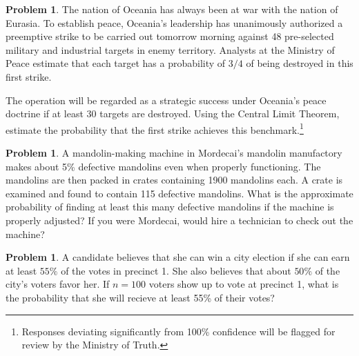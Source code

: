\documentclass[10pt]{article}
\theoremstyle{definition}
\newtheorem{problem}[theorem]{Problem}
\newcommand{\1}[1]{\textbf{1}_{\left[#1\right]}} %
\begin{document}
\begin{problem}%
  \label{problem:1}
  The nation of Oceania has always been at war with the nation of Eurasia. To
  establish peace, Oceania's leadership has unanimously authorized a
  preemptive strike to be carried out tomorrow morning against 48 pre-selected
  military and industrial targets in enemy territory. Analysts at the Ministry
  of Peace estimate that each target has a probability of $3/4$ of being
  destroyed in this first strike.

  The operation will be regarded as a strategic success under Oceania's peace
  doctrine if at least 30 targets are destroyed. Using the Central Limit
  Theorem, estimate the probability that the first strike achieves this
  benchmark.\footnote{Responses deviating significantly from 100\% confidence
    will be flagged for review by the Ministry of Truth.}

\end{problem}




\begin{problem}%
  \label{problem:4}
  A mandolin-making machine in Mordecai's mandolin manufactory makes about 5\%
  defective mandolins even when properly functioning. The mandolins are then
  packed in crates containing 1900 mandolins each. A crate is examined and
  found to contain 115 defective mandolins. What is the approximate
  probability of finding at least this many defective mandolins if the machine
  is properly adjusted? If you were Mordecai, would hire a technician to check
  out the machine?

\end{problem}


\begin{problem}
  \label{problem:5}
  A candidate believes that she can win a city election if she can earn at
  least $55\%$ of the votes in precinct 1. She also believes that about $50\%$
  of the city's voters favor her. If $n=100$ voters show up to vote at precinct
  1, what is the probability that she will recieve at least 55\% of their
  votes?
\end{problem}
\end{document}
